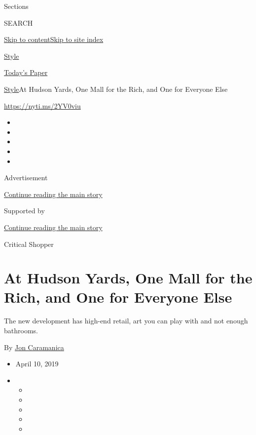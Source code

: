 Sections

SEARCH

\protect\hyperlink{site-content}{Skip to
content}\protect\hyperlink{site-index}{Skip to site index}

\href{https://www.nytimes3xbfgragh.onion/section/style}{Style}

\href{https://myaccount.nytimes3xbfgragh.onion/auth/login?response_type=cookie\&client_id=vi}{}

\href{https://www.nytimes3xbfgragh.onion/section/todayspaper}{Today's
Paper}

\href{/section/style}{Style}\textbar{}At Hudson Yards, One Mall for the
Rich, and One for Everyone Else

\url{https://nyti.ms/2YV0viu}

\begin{itemize}
\item
\item
\item
\item
\item
\end{itemize}

Advertisement

\protect\hyperlink{after-top}{Continue reading the main story}

Supported by

\protect\hyperlink{after-sponsor}{Continue reading the main story}

Critical Shopper

\hypertarget{at-hudson-yards-one-mall-for-the-rich-and-one-for-everyone-else}{%
\section{At Hudson Yards, One Mall for the Rich, and One for Everyone
Else}\label{at-hudson-yards-one-mall-for-the-rich-and-one-for-everyone-else}}

The new development has high-end retail, art you can play with and not
enough bathrooms.

By \href{https://www.nytimes3xbfgragh.onion/by/jon-caramanica}{Jon
Caramanica}

\begin{itemize}
\item
  April 10, 2019
\item
  \begin{itemize}
  \item
  \item
  \item
  \item
  \item
  \end{itemize}
\end{itemize}

